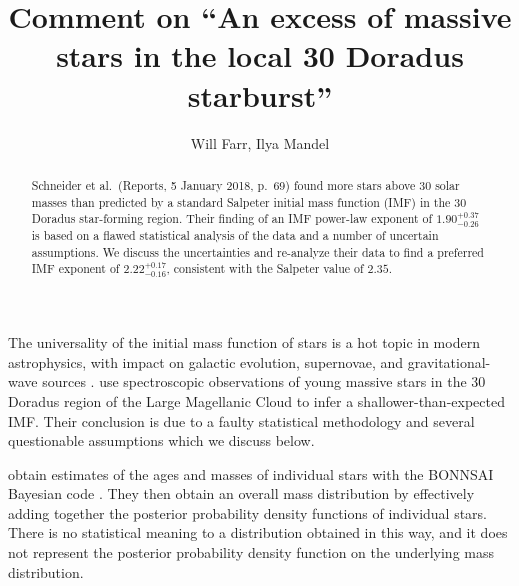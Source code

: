 \documentclass[apjl]{emulateapj}
\newcommand{\onesigrange}[3]{\ensuremath{#1^{+#2}_{-#3}}}
\newcommand{\alpharangethree}{\onesigrange{2.22}{0.17}{0.16}}
\begin{document}
\title{Comment on ``An excess of massive stars in the local 30 Doradus starburst''}

\author{Will Farr, Ilya Mandel}

\begin{abstract}
Schneider et al.~(Reports, 5 January 2018, p.~69) found more stars above 30 solar masses than predicted by a standard Salpeter initial mass function (IMF) in the 30 Doradus star-forming region.  Their finding of an IMF power-law exponent of $1.90^{+0.37}_{-0.26}$ is based on a flawed statistical analysis of the data and a number of uncertain assumptions.  We discuss the uncertainties and re-analyze their data to find a preferred IMF exponent of $\alpharangethree$, consistent with the Salpeter value of $2.35$.
\end{abstract}

\maketitle

The universality of the initial mass function of stars is a hot topic in modern astrophysics, with impact on galactic evolution, supernovae, and gravitational-wave sources \citep{Kroupa:2002,Bastian:2010,deMinkBelczynski:2015}.    \citet{Schneider:2018} use spectroscopic observations of young massive stars in the 30 Doradus region of the Large Magellanic Cloud to infer a shallower-than-expected IMF.  Their conclusion is due to a faulty statistical methodology and several questionable assumptions which we discuss below.

\citet{Schneider:2018} obtain estimates of the ages and masses of individual stars with the BONNSAI Bayesian code \citep{Schneider:2017}.  They then obtain an overall mass distribution by effectively adding together the posterior probability density functions of individual stars.  There is no statistical meaning to a distribution obtained in this way, and it does not represent the posterior probability density function on the underlying mass distribution.  %
\end{document}
